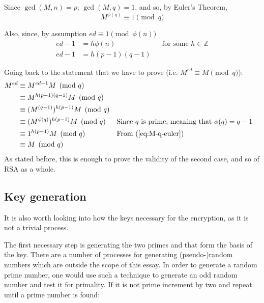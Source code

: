 \documentclass[12pt, titlepage]{article}
\begin{document}
        Since $\gcd(M, n) = p$; $\gcd(M, q) = 1$, and so, by Euler's Theorem,
        \begin{equation} \label{eq:M-q-euler} 
            M^{\phi(q)} \equiv 1 \pmod{q} 
        \end{equation}

        Also, since, by assumption $ed \equiv 1 \pmod{\phi(n)}$
        \begin{align*}
            ed - 1 &= h\phi(n) &&\text{for some } h \in \mathbb{Z}\\
            ed - 1 &= h(p-1)(q-1)
        \end{align*}

        Going back to the statement that we have to prove (i.e. $M^{ed} \equiv M \pmod{q}$):
        \begin{align*}
            M^{ed} &\equiv M^{ed - 1} M \pmod{q} \\
                   &\equiv M^{h(p-1)(q-1)} M \pmod{q} \\
                   &\equiv (M^{(q-1)})^{h(p-1)} M \pmod{q} \\
                   &\equiv (M^{\phi(q)})^{h(p-1)} M \pmod{q} &&\text{Since $q$ is prime,
                   meaning that $\phi(q) = q-1$} \\
                   &\equiv 1^{h(p-1)} M \pmod{q} &&\text{From (\ref{eq:M-q-euler})}\\
                   &\equiv M \pmod{q}
        \end{align*}
        As stated before, this is enough to prove the validity of the second case, and so of
        RSA as a whole.
    
    \subsection{Key generation}
    It is also worth looking into how the keys necessary for the encryption, as it is not a
    trivial process.

    The first necessary step is generating the two primes  and  that form
    the basis of the key. There are a number of processes for generating (pseudo-)random
    numbers which are outside the scope of this essay. In order to generate a random prime
    number, one would use such a technique to generate an odd random number and test it for
    primality.  If it is not prime increment by two and repeat until a prime number is
    found:
    
\end{document}
